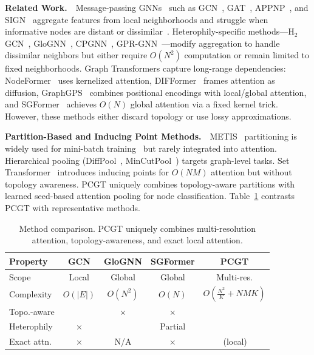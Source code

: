 \documentclass[sigconf]{acmart}
\newcommand{\cmark}{\textcolor{green!60!black}{\checkmark}}
\newcommand{\xmark}{\textcolor{red!70!black}{$\times$}}
\begin{document}
\noindent\textbf{Related Work.}~~Message-passing GNNs~\citep{scarselli2009gnn, gilmer2017mpnn} such as GCN~\citep{kipf2017semi}, GAT~\citep{velickovic2018gat}, APPNP~\citep{klicpera2019appnp}, and SIGN~\citep{rossi2020sign} aggregate features from local neighborhoods and struggle when informative nodes are distant or dissimilar~\citep{li2018oversmoothing}. Heterophily-specific methods---H$_2$GCN~\citep{zhu2020h2gcn}, GloGNN~\citep{li2022glognn}, CPGNN~\citep{zhu2021cpgnn}, GPR-GNN~\citep{chien2021gprgnn}---modify aggregation to handle dissimilar neighbors but either require $O(N^2)$ computation or remain limited to fixed neighborhoods. Graph Transformers capture long-range dependencies: NodeFormer~\citep{wu2022nodeformer} uses kernelized attention, DIFFormer~\citep{wu2023difformer} frames attention as diffusion, GraphGPS~\citep{rampasek2022graphgps} combines positional encodings with local/global attention, and SGFormer~\citep{wu2023sgformer} achieves $O(N)$ global attention via a fixed kernel trick. However, these methods either discard topology or use lossy approximations.

\noindent\textbf{Partition-Based and Inducing Point Methods.}~~METIS~\citep{karypis1998metis} partitioning is widely used for mini-batch training~\citep{chiang2019clustergcn} but rarely integrated into attention. Hierarchical pooling (DiffPool~\citep{ying2018hierarchical}, MinCutPool~\citep{bianchi2020mincut}) targets graph-level tasks. Set Transformer~\citep{lee2019set} introduces inducing points for $O(NM)$ attention but without topology awareness. PCGT uniquely combines topology-aware partitions with learned seed-based attention pooling for node classification. Table~\ref{tab:positioning} contrasts PCGT with representative methods.

\begin{table}[t]
\centering
\small
\begin{tabular}{l|cccc}
\toprule
\textbf{Property} & \textbf{GCN} & \textbf{GloGNN} & \textbf{SGFormer} & \textbf{PCGT} \\
\midrule
Scope & Local & Global & Global & Multi-res. \\
Complexity & $O(|E|)$ & $O(N^2)$ & $O(N)$ & $O(\frac{N^2}{K}\!+\!NMK)$ \\
Topo.-aware & \cmark & \xmark & \xmark & \cmark \\
Heterophily & \xmark & \cmark & Partial & \cmark \\
Exact attn. & \xmark & N/A & \xmark & \cmark\,(local) \\
\bottomrule
\end{tabular}
\caption{Method comparison. PCGT uniquely combines multi-resolution attention, topology-awareness, and exact local attention.}
\label{tab:positioning}
\end{table}
\end{document}
